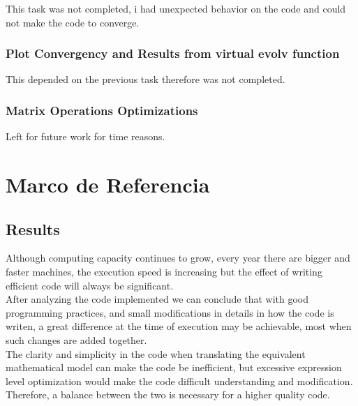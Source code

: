 \documentclass[twoside,letterpaper,12pt]{report}
\begin{document}
	This task was not completed, i had unexpected behavior on the code and could not make the code to converge. 

	\subsection {Plot Convergency and Results from virtual evolv function}

	This depended on the previous task therefore was not completed.
	
	\subsection {Matrix Operations Optimizations}

	Left for future work for time reasons.
	
\chapter{Marco de Referencia}
\label{ChapRef}


\section{Results}

	Although computing capacity continues to grow, every year there are bigger and faster machines, the execution speed is increasing but the effect of writing efficient code will always be significant.\\

	After analyzing the code implemented we can conclude that with good programming practices, and small modifications in details in how the code is writen, a great difference at the time of execution may be achievable, most when such changes are added together.\\

	The clarity and simplicity in the code when translating the equivalent mathematical model can make the code be inefficient, but excessive expression level optimization would make the code difficult understanding and modification. Therefore, a balance between the two is necessary for a higher quality code.\\
\end{document}
